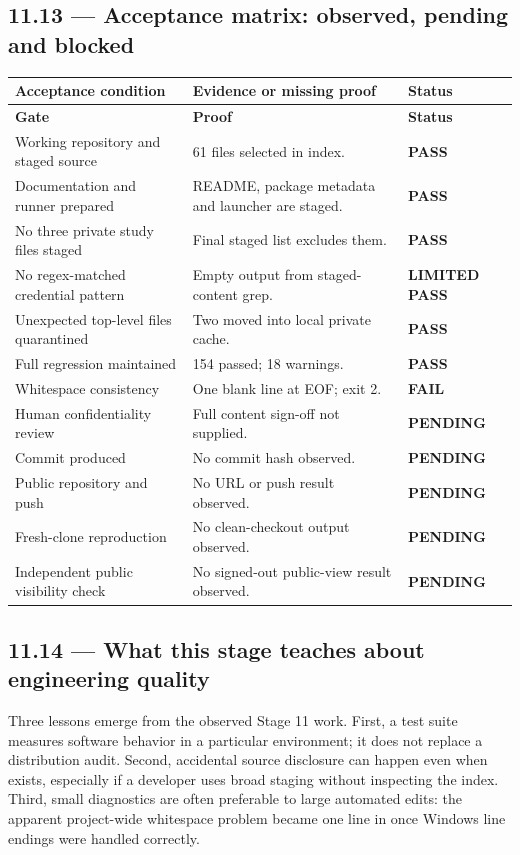 \documentclass[11pt,a4paper]{article}
\DeclareRobustCommand{\code}[1]{{\ttfamily\small\detokenize{#1}}}
\begin{document}
\subsection{11.13 --- Acceptance matrix: observed, pending and blocked}
\begin{longtable}{@{}L{62mm}L{65mm}L{20mm}@{}}
\toprule\textbf{Acceptance condition} & \textbf{Evidence or missing proof} & \textbf{Status}\\\midrule\endfirsthead
\toprule\textbf{Gate} & \textbf{Proof} & \textbf{Status}\\\midrule\endhead
Working repository and staged source & 61 files selected in index. & \textbf{PASS}\\
Documentation and runner prepared & README, package metadata and launcher are staged. & \textbf{PASS}\\
No three private study files staged & Final staged list excludes them. & \textbf{PASS}\\
No regex-matched credential pattern & Empty output from staged-content grep. & \textbf{LIMITED PASS}\\
Unexpected top-level files quarantined & Two moved into local private cache. & \textbf{PASS}\\
Full regression maintained & 154 passed; 18 warnings. & \textbf{PASS}\\
Whitespace consistency & One blank line at \code{.gitignore} EOF; exit 2. & \textbf{FAIL}\\
Human confidentiality review & Full content sign-off not supplied. & \textbf{PENDING}\\
Commit produced & No commit hash observed. & \textbf{PENDING}\\
Public repository and push & No URL or push result observed. & \textbf{PENDING}\\
Fresh-clone reproduction & No clean-checkout output observed. & \textbf{PENDING}\\
Independent public visibility check & No signed-out public-view result observed. & \textbf{PENDING}\\
\bottomrule
\end{longtable}

\subsection{11.14 --- What this stage teaches about engineering quality}
Three lessons emerge from the observed Stage 11 work. First, a test suite measures software behavior in a particular environment; it does not replace a distribution audit. Second, accidental source disclosure can happen even when \code{.gitignore} exists, especially if a developer uses broad staging without inspecting the index. Third, small diagnostics are often preferable to large automated edits: the apparent project-wide whitespace problem became one line in \code{.gitignore} once Windows line endings were handled correctly.
\end{document}
